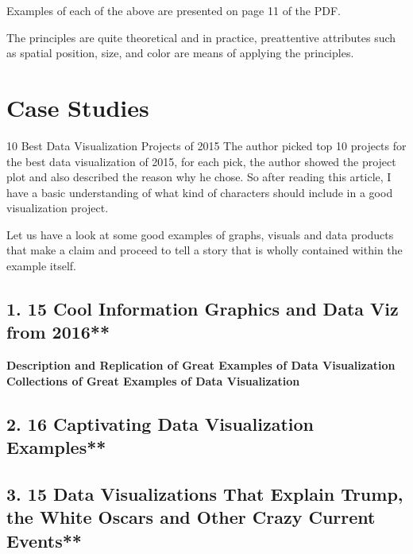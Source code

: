 \documentclass[]{book}
\theoremstyle{definition}
\theoremstyle{definition}
\theoremstyle{definition}
\theoremstyle{remark}
\begin{document}
Examples of each of the above are presented on page 11 of the PDF.

The principles are quite theoretical and in practice, preattentive
attributes such as spatial position, size, and color are means of
applying the principles.

\chapter{Case Studies}\label{case-studies}

10 Best Data Visualization Projects of 2015 \citep{10_BEST} The author
picked top 10 projects for the best data visualization of 2015, for each
pick, the author showed the project plot and also described the reason
why he chose. So after reading this article, I have a basic
understanding of what kind of characters should include in a good
visualization project.

\citep{10_BEST} Let us have a look at some good examples of graphs,
visuals and data products that make a claim and proceed to tell a story
that is wholly contained within the example itself.

\section{\texorpdfstring{1. 15 Cool Information Graphics and Data Viz
from 2016**
\citep{cool_data}}{1. 15 Cool Information Graphics and Data Viz from 2016** {[}@cool\_data{]}}}\label{cool-information-graphics-and-data-viz-from-2016-cool_data}

\textbf{Description and Replication of Great Examples of Data
Visualization} \textbf{Collections of Great Examples of Data
Visualization}

\section{\texorpdfstring{2. 16 Captivating Data Visualization Examples**
\citep{int_viz_capt}}{2. 16 Captivating Data Visualization Examples** {[}@int\_viz\_capt{]}}}\label{captivating-data-visualization-examples-int_viz_capt}

\section{\texorpdfstring{3. 15 Data Visualizations That Explain Trump,
the White Oscars and Other Crazy Current Events**
\citep{int_viz_2}}{3. 15 Data Visualizations That Explain Trump, the White Oscars and Other Crazy Current Events** {[}@int\_viz\_2{]}}}\label{data-visualizations-that-explain-trump-the-white-oscars-and-other-crazy-current-events-int_viz_2}
\end{document}
